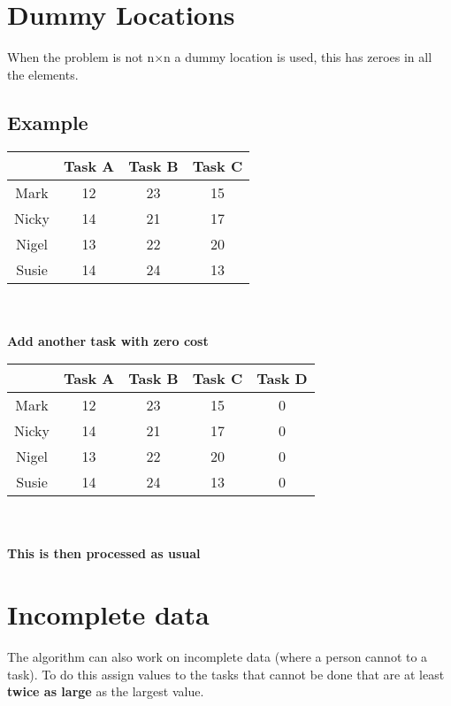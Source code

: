 \documentclass{article}[18pt]
\begin{document}
\section{Dummy Locations}
When the problem is not n$\times$n a dummy location is used, this has zeroes in all the elements.
\subsection{Example}
\begin{tabular}{|c|c|c|c|}
\hline
&Task A&Task B&Task C\\
\hline
Mark&12&23&15\\
\hline
Nicky&14&21&17\\
\hline
Nigel&13&22&20\\
\hline
Susie&14&24&13\\
\hline
\end{tabular}\\
\\
\textbf{Add another task with zero cost}\\
\begin{tabular}{|c|c|c|c|c|}
\hline
&Task A&Task B&Task C&Task D\\
\hline
Mark&12&23&15&0\\
\hline
Nicky&14&21&17&0\\
\hline
Nigel&13&22&20&0\\
\hline
Susie&14&24&13&0\\
\hline
\end{tabular}\\
\\
\textbf{This is then processed as usual}
\section{Incomplete data}
The algorithm can also work on incomplete data (where a person cannot to a task). To do this assign values to the tasks that cannot be done that are at least \textbf{twice as large} as the largest value.
\end{document}
